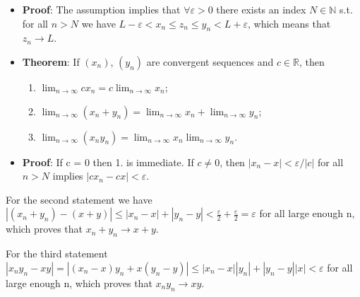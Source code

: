 \documentclass{article}
\begin{document}
\begin{itemize}
\item \textbf{Proof}: The assumption implies that $\forall \varepsilon > 0$ there exists an index $N \in \mathbb{N}$ s.t. for all $n > N$ we have $L - \varepsilon < x_n \leq z_n \leq y_n < L + \varepsilon$, which means that $z_n \to L$. 

\item \textbf{Theorem}: If $(x_n)$, $(y_n)$ are convergent sequences and $c \in \mathbb{R}$, then
\begin{enumerate}
    \item $\displaystyle \lim_{n\to\infty} cx_n = c \lim_{n\to\infty} x_n$; 
    \item $\displaystyle \lim_{n\to\infty} (x_n + y_n) = \lim_{n\to\infty} x_n + \lim_{n\to\infty} y_n$; 
    \item$\displaystyle \lim_{n\to\infty} (x_n y_n) = \lim_{n\to\infty} x_n \lim_{n\to\infty} y_n$.
\end{enumerate}
\item \textbf{Proof}: If c = 0 then 1. is immediate. If $c \neq 0$, then $|x_n - x| < \varepsilon/|c|$ for all $n > N$ implies $|cx_n - cx| < \varepsilon$.
\end{itemize}

For the second statement we have $|(x_n + y_n) - (x + y)| \leq |x_n - x| + |y_n - y| < \frac{\varepsilon}{2} + \frac{\varepsilon}{2} = \varepsilon$ for all large enough n, which proves that $x_n + y_n \to x + y$.

For the third statement $|x_n y_n - xy| = |(x_n - x)y_n + x(y_n - y)| \leq |x_n - x||y_n| + |y_n - y||x| < \varepsilon$ for all large enough n, which proves that $x_n y_n \to xy$.
\end{document}
